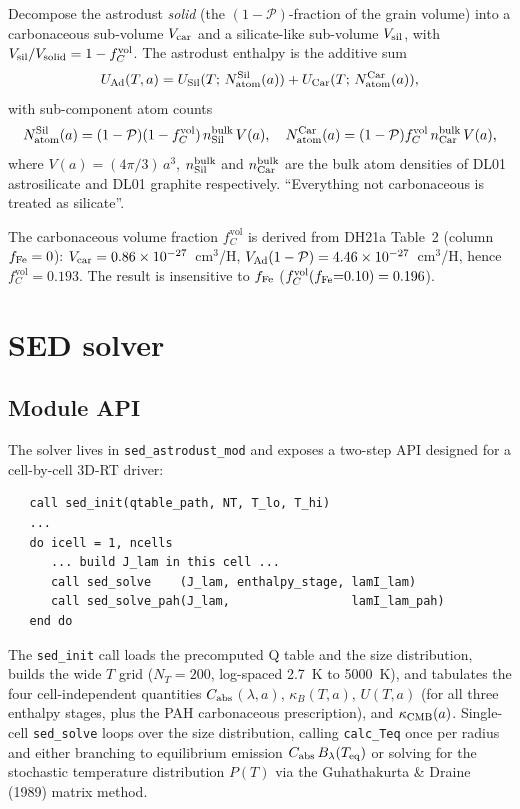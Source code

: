 \documentclass{my_memo}
\newcommand{\Cabs}{\ensuremath{C_{\rm abs}}}
\newcommand{\Teq}{\ensuremath{T_{\rm eq}}}
\newcommand{\fc}{\ensuremath{f_{C}^{\text{vol}}}}
\begin{document}
Decompose the astrodust \emph{solid} (the $(1-\mathcal{P})$-fraction
of the grain volume) into a carbonaceous sub-volume $V_{\rm car}$ and
a silicate-like sub-volume $V_{\rm sil}$, with
$V_{\rm sil}/V_{\rm solid} = 1 - \fc$. The astrodust enthalpy is the
additive sum
\begin{equation}
U_{\rm Ad}(T, a) = U_{\rm Sil}(T;\, N_{\rm atom}^{\rm Sil}(a))
                 + U_{\rm Car}(T;\, N_{\rm atom}^{\rm Car}(a)),
\end{equation}
with sub-component atom counts
\begin{equation}
N_{\rm atom}^{\rm Sil}(a) = (1-\mathcal{P})(1-\fc)\,n_{\rm Sil}^{\rm bulk}\,V(a),
\quad
N_{\rm atom}^{\rm Car}(a) = (1-\mathcal{P})\fc\,n_{\rm Car}^{\rm bulk}\,V(a),
\end{equation}
where $V(a) = (4\pi/3)\,a^3$, $n_{\rm Sil}^{\rm bulk}$ and
$n_{\rm Car}^{\rm bulk}$ are the bulk atom densities of DL01
astrosilicate and DL01 graphite respectively. ``Everything not
carbonaceous is treated as silicate''.

The carbonaceous volume fraction $\fc$ is derived from DH21a Table~2
(column $f_{\rm Fe} = 0$): $V_{\rm car} = 0.86\times10^{-27}$~cm$^3$/H,
$V_{\rm Ad}(1-\mathcal{P}) = 4.46\times10^{-27}$~cm$^3$/H, hence
$\fc = 0.193$. The result is insensitive to $f_{\rm Fe}$
($\fc(f_{\rm Fe}{=}0.10) = 0.196$).


\section{SED solver}

\subsection{Module API}

The solver lives in \texttt{sed\_astrodust\_mod} and exposes a
two-step API designed for a cell-by-cell 3D-RT driver:
\begin{verbatim}
   call sed_init(qtable_path, NT, T_lo, T_hi)
   ...
   do icell = 1, ncells
      ... build J_lam in this cell ...
      call sed_solve    (J_lam, enthalpy_stage, lamI_lam)
      call sed_solve_pah(J_lam,                 lamI_lam_pah)
   end do
\end{verbatim}
The \texttt{sed\_init} call loads the precomputed Q table and the size
distribution, builds the wide $T$ grid ($N_T = 200$, log-spaced 2.7~K
to 5000~K), and tabulates the four cell-independent quantities
\Cabs$(\lambda, a)$, $\kappa_B(T, a)$, $U(T, a)$ (for all three
enthalpy stages, plus the PAH carbonaceous prescription), and
$\kappa_{\rm CMB}(a)$. Single-cell \texttt{sed\_solve} loops over the
size distribution, calling \texttt{calc\_Teq} once per radius and
either branching to equilibrium emission $\Cabs\,B_\lambda(\Teq)$ or
solving for the stochastic temperature distribution $P(T)$ via the
Guhathakurta \& Draine (1989) matrix method.
\end{document}
